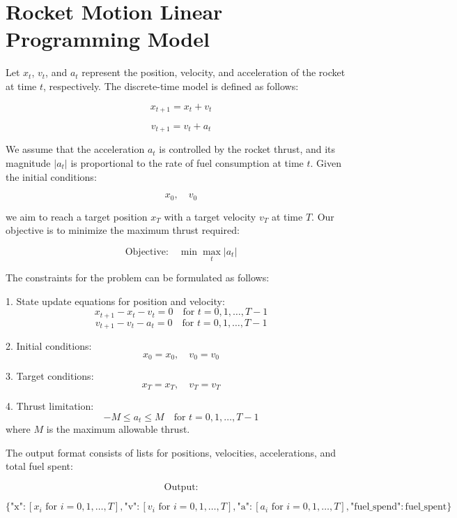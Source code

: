 \documentclass{article}
\begin{document}
\section*{Rocket Motion Linear Programming Model}

Let \( x_t \), \( v_t \), and \( a_t \) represent the position, velocity, and acceleration of the rocket at time \( t \), respectively. The discrete-time model is defined as follows:

\[
x_{t+1} = x_t + v_t
\]

\[
v_{t+1} = v_t + a_t
\]

We assume that the acceleration \( a_t \) is controlled by the rocket thrust, and its magnitude \( |a_t| \) is proportional to the rate of fuel consumption at time \( t \). Given the initial conditions:

\[
x_0, \quad v_0
\]

we aim to reach a target position \( x_T \) with a target velocity \( v_T \) at time \( T \). Our objective is to minimize the maximum thrust required:

\[
\text{Objective:} \quad \min \max_{t} |a_t|
\]

The constraints for the problem can be formulated as follows:

1. State update equations for position and velocity:
   \[
   x_{t+1} - x_t - v_t = 0 \quad \text{for } t = 0, 1, \dots, T-1
   \]
   \[
   v_{t+1} - v_t - a_t = 0 \quad \text{for } t = 0, 1, \dots, T-1
   \]

2. Initial conditions:
   \[
   x_0 = x_0, \quad v_0 = v_0
   \]

3. Target conditions:
   \[
   x_T = x_T, \quad v_T = v_T
   \]

4. Thrust limitation:
   \[
   -M \leq a_t \leq M \quad \text{for } t = 0, 1, \dots, T-1
   \]
   where \( M \) is the maximum allowable thrust.

The output format consists of lists for positions, velocities, accelerations, and total fuel spent:

\[
\text{Output:}
\]

\[
\{ 
\text{"x"}: [x_i \text{ for } i = 0, 1, \ldots, T], 
\text{"v"}: [v_i \text{ for } i = 0, 1, \ldots, T], 
\text{"a"}: [a_i \text{ for } i = 0, 1, \ldots, T], 
\text{"fuel\_spend"}: \text{fuel\_spent}
\}
\]
\end{document}
